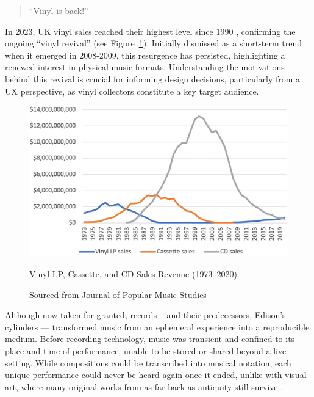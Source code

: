             \begin{quote}
                ``Vinyl is back!'' \cite{bechhofervttspec}
            \end{quote}
            
            In 2023, UK vinyl sales reached their highest level since 1990 \cite{geraghty2023uk_vinyl_sales}, confirming the ongoing ``vinyl revival'' \cite{vinylRevival} (see Figure~\ref{fig:vinyl_sales}). Initially dismissed as a short-term trend when it emerged in 2008-2009, this resurgence has persisted, highlighting a renewed interest in physical music formats. Understanding the motivations behind this revival is crucial for informing design decisions, particularly from a UX perspective, as vinyl collectors constitute a key target audience.
            
            \begin{figure}[htbp]
                \centering
                \includegraphics[width=\linewidth]{images/vinyl_sales_2023.png}
                \caption{Vinyl LP, Cassette, and CD Sales Revenue (1973–2020).}
                \caption*{Sourced from Journal of Popular Music Studies \cite{vinylRevival}}
                \label{fig:vinyl_sales}
            \end{figure}
    
            Although now taken for granted, records -- and their predecessors, Edison's cylinders — transformed music from an ephemeral experience into a reproducible medium. Before recording technology, music was transient and confined to its place and time of performance, unable to be stored or shared beyond a live setting. While compositions could be transcribed into musical notation, each unique performance could never be heard again once it ended, unlike with visual art, where many original works from as far back as antiquity still survive \cite{jdbond}.
    
